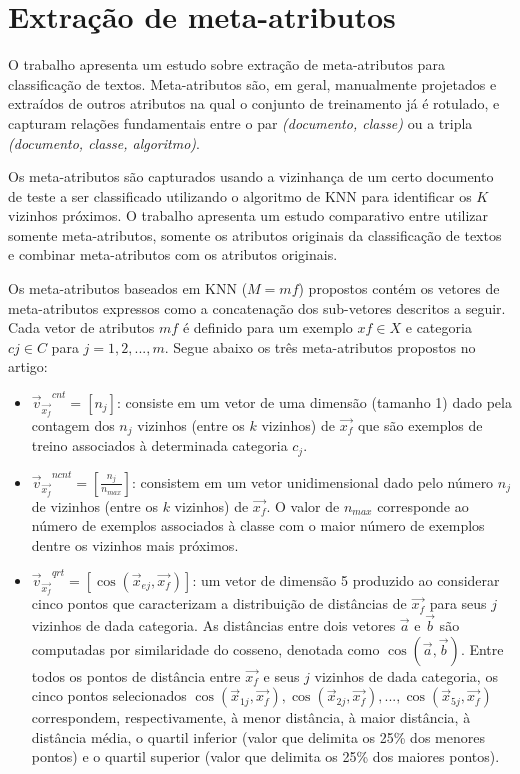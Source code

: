 \section{Extração de meta-atributos}\label{sec:trabrel-2}

O trabalho \cite{canutoestudo} apresenta um estudo sobre extração de meta-atributos para classificação de textos. Meta-atributos são, em geral, manualmente projetados e extraídos de outros atributos na qual o conjunto de treinamento já é rotulado, e capturam relações fundamentais entre o par \textit{(documento, classe)} ou a tripla \textit{(documento, classe, algoritmo)}. 

Os meta-atributos são capturados usando a  vizinhança de um certo documento de teste a ser classificado utilizando o algoritmo de KNN para identificar os $K$ vizinhos próximos. O trabalho apresenta um estudo comparativo entre utilizar somente meta-atributos, somente os atributos originais da classificação de textos e combinar meta-atributos com os atributos originais.

Os meta-atributos baseados em KNN ($M = {mf}$) propostos  contém os vetores de meta-atributos expressos como a concatenação dos sub-vetores descritos a seguir. Cada vetor de atributos $mf$ é definido para um exemplo $xf \in X$ e categoria $cj \in C$ para $j = 1, 2, ... , m$. Segue abaixo os três meta-atributos propostos no artigo:

\begin{itemize}
    \item ${\vec{v}_\vec{x_f}}^{cnt} = [n_j]$:  consiste em um vetor de uma dimensão (tamanho 1) dado pela contagem dos $n_j$ vizinhos (entre os $k$ vizinhos) de $\vec{x_f}$ que são exemplos de treino associados à determinada categoria $c_j$.
    \item ${\vec{v}_\vec{x_f}}^{ncnt} = [\frac{n_j}{n_{max}}]$: consistem em um vetor unidimensional dado pelo número $n_j$ de vizinhos (entre os $k$ vizinhos) de $\vec{x_f}$. O valor de $n_{max}$ corresponde ao número de exemplos associados à classe com o maior número de exemplos dentre os vizinhos mais próximos.
    \item ${\vec{v}_\vec{x_f}}^{qrt} = [\cos{(\vec{x}_{ej}, \vec{x_f})}]$: um vetor de dimensão 5 produzido ao considerar cinco pontos que caracterizam a distribuição de distâncias de $\vec{x_f}$ para seus $j$ vizinhos de dada categoria. As distâncias entre dois vetores $\vec{a}$ e $\vec{b}$ são computadas por similaridade do cosseno, denotada como $\cos{(\vec{a}, \vec{b})}$. Entre todos os pontos de distância entre $\vec{x_f}$ e seus $j$ vizinhos de dada categoria, os cinco pontos selecionados $\cos{(\vec{x}_{1j}, \vec{x_f})}, \cos{(\vec{x}_{2j}, \vec{x_f})}, ... , \cos{(\vec{x}_{5j}, \vec{x_f})}$ correspondem, respectivamente, à menor distância, à
maior distância, à distância média, o quartil inferior (valor que delimita os 25\% dos menores pontos) e o quartil superior (valor que delimita os 25\% dos maiores pontos).
\end{itemize}

